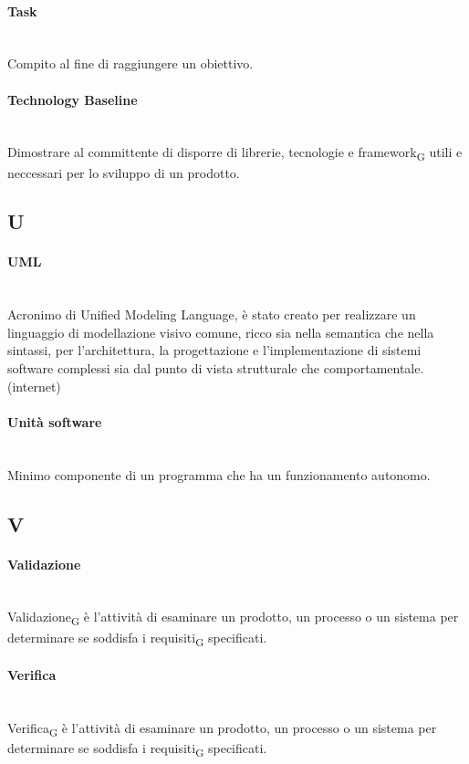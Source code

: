 \paragraph{Task}~\smallskip \\
Compito al fine di raggiungere un obiettivo.

\paragraph{Technology Baseline}~\smallskip \\
Dimostrare al committente di disporre di librerie, tecnologie e framework\textsubscript{G} utili e neccessari per lo sviluppo di un prodotto.

\newpage
{}
\subsection*{U}
\paragraph{UML}~\smallskip \\
Acronimo di Unified Modeling Language, è stato creato per realizzare un linguaggio di modellazione visivo comune, ricco 
sia nella semantica che nella sintassi, per l'architettura, la progettazione e l'implementazione di sistemi 
software complessi sia dal punto di vista strutturale che comportamentale. (internet)

\paragraph{Unità software}~\smallskip \\
Minimo componente di un programma che ha un funzionamento autonomo.
\newpage
{}
\subsection*{V}
\paragraph{Validazione}~\smallskip \\
Validazione\textsubscript{G} è l'attività di esaminare un prodotto, un processo o un sistema per determinare se soddisfa i requisiti\textsubscript{G} specificati.

\paragraph{Verifica}~\smallskip \\
Verifica\textsubscript{G} è l'attività di esaminare un prodotto, un processo o un sistema per determinare se soddisfa i requisiti\textsubscript{G} specificati.




